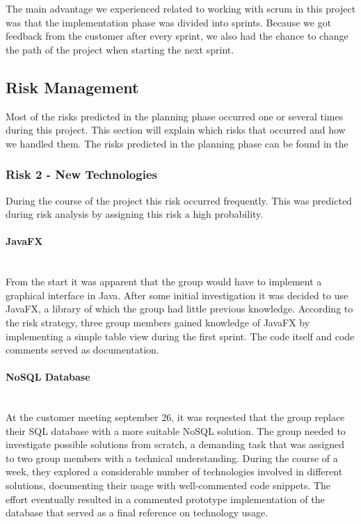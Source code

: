 \documentclass[../document]{subfiles}
\begin{document}
The main advantage we experienced related to working with scrum in this project was that the implementation phase was divided into sprints. Because we got feedback from the customer after every sprint, we also had the chance to change the path of the project when starting the next sprint.  

\subsection{Risk Management}
\label{risk_management}
Most of the risks predicted in the planning phase occurred one or several times during this project. This section will explain which risks that occurred and how we handled them.  The risks predicted in the planning phase can be found in the 

\subsubsection{Risk 2 - New Technologies}
During the course of the project this risk occurred frequently. This was predicted during risk analysis by assigning this risk a high probability. 

\paragraph{\gls{JavaFX}} \ \\
From the start it was apparent that the group would have to implement a graphical interface in \gls{Java}. After some initial investigation it was decided to use \gls{JavaFX}, a library of which the group had little previous knowledge. According to the risk strategy, three group members gained knowledge of \gls{JavaFX} by implementing a simple table view during the first sprint. The code itself and code comments served as documentation. 

\paragraph{NoSQL Database} \ \\
At the customer meeting september 26, it was requested that the group replace their \gls{SQL} database with a more suitable NoSQL solution. The group needed to investigate possible solutions from scratch, a demanding task that was assigned to two group members with a technical understanding. During the course of a week, they explored a considerable number of technologies involved in different solutions, documenting their usage with well-commented code snippets. The effort eventually resulted in a commented prototype implementation of the database that served as a final reference on technology usage.
\end{document}
